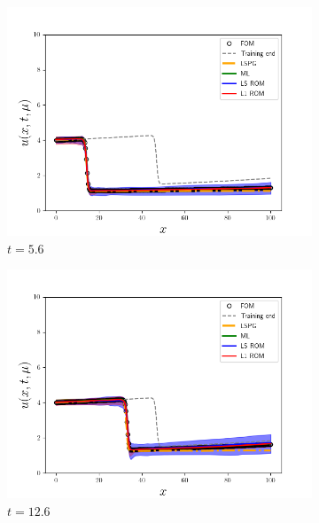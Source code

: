 \documentclass[3p,computermodern,10pt]{elsarticle}
\begin{document}
\begin{figure}
\begin{center}
\begin{subfigure}[t]{0.24\textwidth}
\includegraphics[trim={0cm 0cm 0cm 0cm},clip,width=1.0\linewidth]{code/burgers/synapse_models/basis_study/results/figures/uquartiles_mu1_0_mu2_0_t_0080.png} 
\caption{$t=5.6$}
\end{subfigure}
\begin{subfigure}[t]{0.24\textwidth}
\includegraphics[trim={0cm 0cm 0cm 0cm},clip,width=1.0\linewidth]{code/burgers/synapse_models/basis_study/results/figures/uquartiles_mu1_0_mu2_0_t_0180.png} 
\caption{$t=12.6$}
\end{subfigure}
\begin{subfigure}[t]{0.24\textwidth}

\end{subfigure}
\end{center}
\end{figure}
\end{document}
